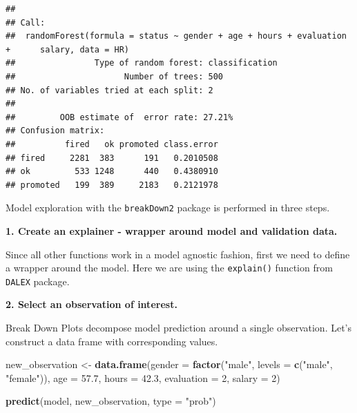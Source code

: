 \documentclass[]{krantz}
\newenvironment{Shaded}{\begin{snugshade}}{\end{snugshade}}
\newcommand{\DataTypeTok}[1]{\textcolor[rgb]{0.13,0.29,0.53}{#1}}
\newcommand{\DecValTok}[1]{\textcolor[rgb]{0.00,0.00,0.81}{#1}}
\newcommand{\FloatTok}[1]{\textcolor[rgb]{0.00,0.00,0.81}{#1}}
\newcommand{\KeywordTok}[1]{\textcolor[rgb]{0.13,0.29,0.53}{\textbf{#1}}}
\newcommand{\NormalTok}[1]{#1}
\newcommand{\OperatorTok}[1]{\textcolor[rgb]{0.81,0.36,0.00}{\textbf{#1}}}
\newcommand{\StringTok}[1]{\textcolor[rgb]{0.31,0.60,0.02}{#1}}
\theoremstyle{definition}
\theoremstyle{definition}
\theoremstyle{definition}
\theoremstyle{remark}
\begin{document}
\begin{verbatim}
## 
## Call:
##  randomForest(formula = status ~ gender + age + hours + evaluation +      salary, data = HR) 
##                Type of random forest: classification
##                      Number of trees: 500
## No. of variables tried at each split: 2
## 
##         OOB estimate of  error rate: 27.21%
## Confusion matrix:
##          fired   ok promoted class.error
## fired     2281  383      191   0.2010508
## ok         533 1248      440   0.4380910
## promoted   199  389     2183   0.2121978
\end{verbatim}

Model exploration with the \texttt{breakDown2} package is performed in
three steps.

\textbf{1. Create an explainer - wrapper around model and validation
data.}

Since all other functions work in a model agnostic fashion, first we
need to define a wrapper around the model. Here we are using the
\texttt{explain()} function from \texttt{DALEX} package.

\begin{Shaded}
\end{Shaded}

\textbf{2. Select an observation of interest.}

Break Down Plots decompose model prediction around a single observation.
Let's construct a data frame with corresponding values.

\begin{Shaded}
\begin{Highlighting}[]
\NormalTok{new_observation <-}\StringTok{ }\KeywordTok{data.frame}\NormalTok{(}\DataTypeTok{gender =} \KeywordTok{factor}\NormalTok{(}\StringTok{"male"}\NormalTok{, }\DataTypeTok{levels =} \KeywordTok{c}\NormalTok{(}\StringTok{"male"}\NormalTok{, }\StringTok{"female"}\NormalTok{)),}
                      \DataTypeTok{age =} \FloatTok{57.7}\NormalTok{,}
                      \DataTypeTok{hours =} \FloatTok{42.3}\NormalTok{,}
                      \DataTypeTok{evaluation =} \DecValTok{2}\NormalTok{,}
                      \DataTypeTok{salary =} \DecValTok{2}\NormalTok{)}

\KeywordTok{predict}\NormalTok{(model, new_observation, }\DataTypeTok{type =} \StringTok{"prob"}\NormalTok{)}
\end{Highlighting}
\end{Shaded}
\end{document}
